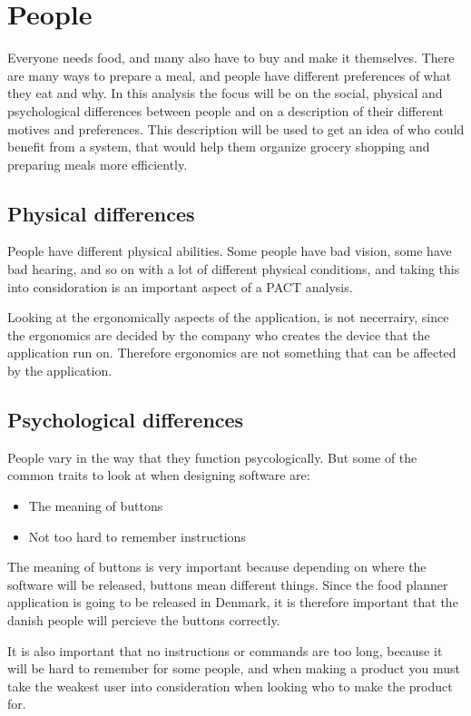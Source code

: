 \section{People}
Everyone needs food, and many also have to buy and make it themselves. There are many ways to prepare a meal, and people have different preferences of what they eat and why. In this analysis the focus will be on the social, physical and psychological differences between people and on a description of their different motives and preferences. This description will be used to get an idea of who could benefit from a system, that would help them organize grocery shopping and preparing meals more efficiently.

\subsection{Physical differences}

People have different physical abilities. Some people have bad vision, some have bad hearing, and so on with a lot of different physical conditions, and taking this into considoration is an important aspect of a PACT analysis.

Looking at the ergonomically aspects of the application, is not necerrairy, since the ergonomics are decided by the company who creates the device that the application run on. Therefore ergonomics are not something that can be affected by the application.

\subsection{Psychological differences}

People vary in the way that they function psycologically. But some of the common traits to look at when designing software are:

\begin{itemize}
    \item The meaning of buttons
    \item Not too hard to remember instructions
\end{itemize}

The meaning of buttons is very important because depending on where the software will be released, buttons mean different things. Since the food planner application is going to be released in Denmark, it is therefore important that the danish people will percieve the buttons correctly.

It is also important that no instructions or commands are too long, because it will be hard to remember for some people, and when making a product you must take the weakest user into consideration when looking who to make the product for.

